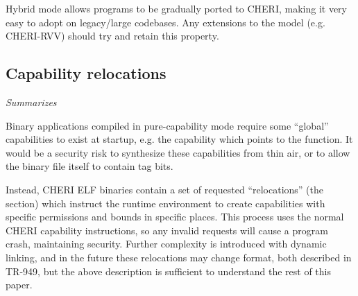 Hybrid mode allows programs to be gradually ported to CHERI, making it very easy to adopt on legacy/large codebases.
Any extensions to the model (e.g. CHERI-RVV) should try and retain this property.

\subsection{Capability relocations\label{chap:bg:subsec:cherirelocs}}
\emph{Summarizes~\cite[Section~4.4, Appendix C]{TR-949}}

Binary applications compiled in pure-capability mode require some ``global'' capabilities to exist at startup, e.g. the capability which points to the  function.
It would be a security risk to synthesize these capabilities from thin air, or to allow the binary file itself to contain tag bits.

Instead, CHERI ELF binaries contain a set of requested ``relocations'' (the  section) which instruct the runtime environment to create capabilities with specific permissions and bounds in specific places.
This process uses the normal CHERI capability instructions, so any invalid requests will cause a program crash, maintaining security.
Further complexity is introduced with dynamic linking, and in the future these relocations may change format, both described in TR-949\cite{TR-949}, but the above description is sufficient to understand the rest of this paper.


